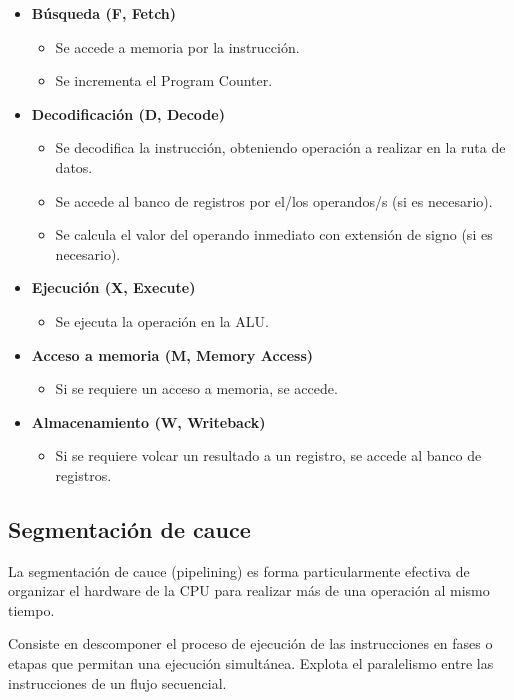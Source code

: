 \begin{itemize}
  \item \textbf{Búsqueda (F, Fetch)}
  \begin{itemize}
    \item Se accede a memoria por la instrucción.
    \item Se incrementa el Program Counter.
  \end{itemize}
  \item \textbf{Decodificación (D, Decode)}
  \begin{itemize}
    \item Se decodifica la instrucción, obteniendo operación a realizar en la ruta de datos.
    \item Se accede al banco de registros por el/los operandos/s (si es necesario).
    \item Se calcula el valor del operando inmediato con extensión de signo (si es necesario).
  \end{itemize}
  \item \textbf{Ejecución (X, Execute)}
  \begin{itemize}
    \item Se ejecuta la operación en la ALU.\@
  \end{itemize}
  \item \textbf{Acceso a memoria (M, Memory Access)}
  \begin{itemize}
    \item Si se requiere un acceso a memoria, se accede.
  \end{itemize}
  \item \textbf{Almacenamiento (W, Writeback)}
  \begin{itemize}
    \item Si se requiere volcar un resultado a un registro, se accede al banco de registros.
  \end{itemize}
\end{itemize}

\subsection{Segmentación de cauce}

La segmentación de cauce (pipelining) es forma particularmente efectiva de organizar el hardware de la CPU para realizar más de una operación al mismo tiempo. 

Consiste en descomponer el proceso de ejecución de las instrucciones en fases o etapas que permitan una ejecución simultánea. Explota el paralelismo entre las instrucciones de un flujo secuencial.

